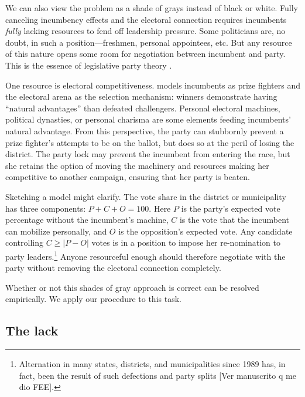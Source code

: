 \documentclass[letter,12pt]{article}
\begin{document}

We can also view the problem as a shade of grays instead of black or white. Fully canceling incumbency effects and the electoral connection requires incumbents \emph{fully} lacking resources to fend off leadership pressure. Some politicians are, no doubt, in such a position---freshmen, personal appointees, etc. But any resource of this nature opens some room for negotiation between incumbent and party. This is the essence of legislative party theory \citep{cox.mccubbins.2007leviath2nd,aldrich.rohdeCPG2001}.

One resource is electoral competitiveness. \citet{zallerprizeFighters} models incumbents as prize fighters and the electoral arena as the selection mechanism: winners demonstrate having ``natural advantages'' than defeated challengers. Personal electoral machines, political dynasties, or personal charisma are some elements feeding incumbents' natural advantage. From this perspective, the party can stubbornly prevent a prize fighter's attempts to be on the ballot, but does so at the peril of losing the district. The party lock may prevent the incumbent from entering the race, but she retains the option of moving the machinery and resources making her competitive to another campaign, ensuring that her party is beaten.

Sketching a model might clarify. The vote share in the district or municipality has three components: $P + C + O = 100$. Here $P$ is the party's expected vote percentage without the incumbent's machine, $C$ is the vote that the incumbent can mobilize personally, and $O$ is the opposition's expected vote. Any candidate controlling $C \ge |P-O|$ votes is in a position to impose her re-nomination to party leaders.\footnote{Alternation in many states, districts, and municipalities since 1989 has, in fact, been the result of such defections and party splits [Ver manuscrito q me dio FEE].} Anyone resourceful enough should therefore negotiate with the party without removing the electoral connection completely.

Whether or not this shades of gray approach is correct can be resolved empirically. We apply our procedure to this task. 

\subsection{The lack}
\end{document}
